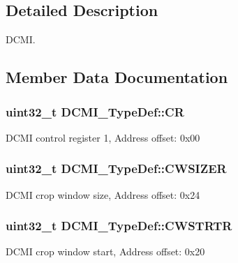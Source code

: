 \subsection{Detailed Description}
D\+C\+MI. 

\subsection{Member Data Documentation}
\subsubsection[{\texorpdfstring{CR}{CR}}]{ uint32\+\_\+t D\+C\+M\+I\+\_\+\+Type\+Def\+::\+CR}\hypertarget{struct_d_c_m_i___type_def_a3cfcc9860ca551cbcb10c1c3dd4304f0}{}\label{struct_d_c_m_i___type_def_a3cfcc9860ca551cbcb10c1c3dd4304f0}
D\+C\+MI control register 1, Address offset\+: 0x00 
\subsubsection[{\texorpdfstring{C\+W\+S\+I\+Z\+ER}{CWSIZER}}]{ uint32\+\_\+t D\+C\+M\+I\+\_\+\+Type\+Def\+::\+C\+W\+S\+I\+Z\+ER}\hypertarget{struct_d_c_m_i___type_def_a1b9c8048339e19b110ecfbea486f55df}{}\label{struct_d_c_m_i___type_def_a1b9c8048339e19b110ecfbea486f55df}
D\+C\+MI crop window size, Address offset\+: 0x24 
\subsubsection[{\texorpdfstring{C\+W\+S\+T\+R\+TR}{CWSTRTR}}]{ uint32\+\_\+t D\+C\+M\+I\+\_\+\+Type\+Def\+::\+C\+W\+S\+T\+R\+TR}\hypertarget{struct_d_c_m_i___type_def_a4d58830323e567117c12ae3feac613b9}{}\label{struct_d_c_m_i___type_def_a4d58830323e567117c12ae3feac613b9}
D\+C\+MI crop window start, Address offset\+: 0x20 
